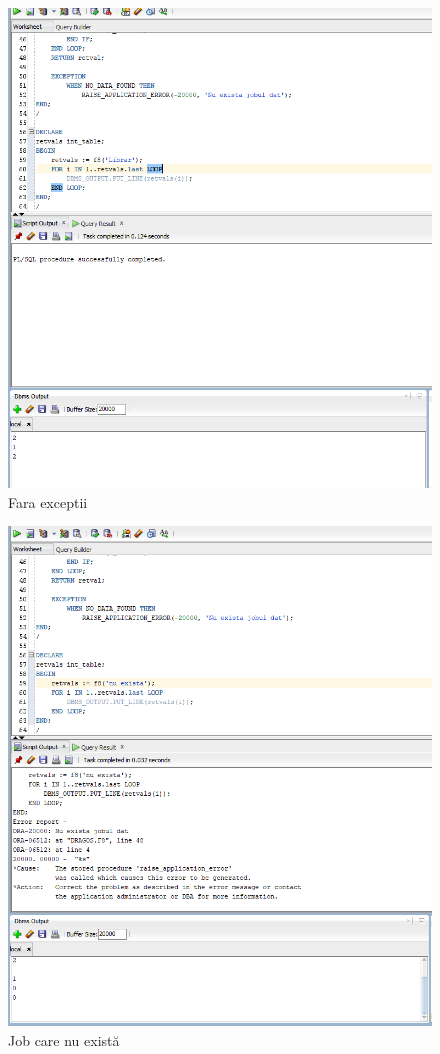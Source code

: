 \documentclass[12pt]{article}
\begin{document}
\begin{figure}[!htb]
\includegraphics[max width=\linewidth]{imgs/ex8_1.png}
\caption{Fara exceptii}
\label{fig:ex8_1}
\end{figure}
\begin{figure}[!htb]
\includegraphics[max width=\linewidth]{imgs/ex8_2.png}
\caption{Job care nu există}
\label{fig:ex8_2}
\end{figure}
\end{document}
